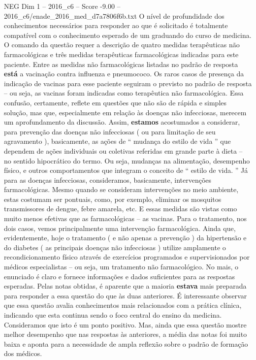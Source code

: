 \begin{textsample}{NEG Dim 1 – 2016\_c6 – Score -9.00 – 2016\_c6/enade\_2016\_med\_d7a7806f6b.txt}
O nível de profundidade dos conhecimentos necessários para responder ao que é solicitado é totalmente compatível com o conhecimento esperado de um graduando do curso de medicina.
O comando da questão requer a descrição de quatro medidas terapêuticas não farmacológicas e três medidas terapêuticas farmacológicas indicadas para este paciente.
Entre as medidas não farmacológicas listadas no padrão de resposta \textbf{está} a vacinação contra influenza e pneumococo.
Os raros casos de presença da indicação de vacinas para esse paciente seguiram o previsto no padrão de resposta – ou seja, as vacinas foram indicadas como terapêutica não farmacológica.
Essa confusão, certamente, reflete em questões que não são de rápida e simples solução, mas que, especialmente em relação às doenças não infecciosas, merecem um aprofundamento da discussão.
Assim, \textbf{estamos} acostumados a considerar, para prevenção das doenças não infecciosas ( ou para limitação de seu agravamento ), basicamente, as ações de “ mudança do estilo de vida ” que dependem de ações individuais ou coletivas referidas em grande parte à dieta – no sentido hipocrático do termo.
Ou seja, mudanças na alimentação, desempenho físico, e outros comportamentos que integram o conceito de “ estilo de vida. ” Já para as doenças infecciosas, consideramos, basicamente, intervenções farmacológicas.
Mesmo quando se consideram intervenções no meio ambiente, estas costumam ser pontuais, como, por exemplo, eliminar os mosquitos transmissores de dengue, febre amarela, etc.
E essas medidas são vistas como muito menos efetivas que as farmacológicas – as vacinas.
Para o tratamento, nos dois casos, vemos principalmente uma intervenção farmacológica.
Ainda que, evidentemente, hoje o tratamento ( e não apenas a prevenção ) da hipertensão e do diabetes ( as principais doenças não infecciosas ) utilize amplamente o recondicionamento físico através de exercícios programados e supervisionados por médicos especialistas – ou seja, um tratamento não farmacológico.
No mais, o enunciado é claro e fornece informações e dados suficientes para as respostas esperadas.
Pelas notas obtidas, é aparente que a maioria \textbf{estava} mais preparada para responder a essa questão do que às duas anteriores.
É interessante observar que essa questão avalia conhecimentos mais relacionados com a prática clínica, indicando que esta continua sendo o foco central do ensino da medicina.
Consideramos que isto é um ponto positivo.
Mas, ainda que essa questão mostre melhor desempenho que nas respostas às anteriores, a média das notas foi muito baixa e aponta para a necessidade de ampla reflexão sobre o padrão de formação dos médicos.

\end{textsample}
